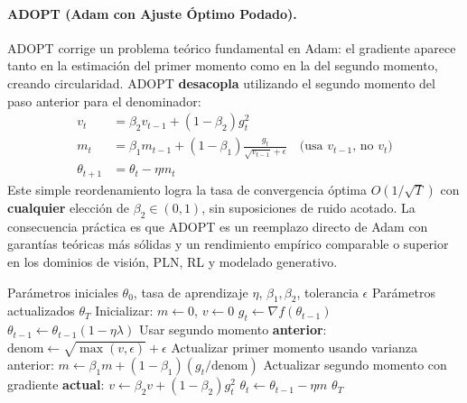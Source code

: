 \paragraph{ADOPT (Adam con Ajuste Óptimo Podado).}
ADOPT corrige un problema teórico fundamental en Adam: el gradiente aparece tanto en la estimación del primer momento como en la del segundo momento, creando circularidad. ADOPT \textbf{desacopla} utilizando el segundo momento del paso anterior para el denominador:
\begin{align}
v_t &= \beta_2 v_{t-1} + (1-\beta_2)g_t^2 \\
m_t &= \beta_1 m_{t-1} + (1-\beta_1)\frac{g_t}{\sqrt{v_{t-1}}+\epsilon} \quad\text{(usa $v_{t-1}$, no $v_t$)} \\
\theta_{t+1} &= \theta_t - \eta m_t
\end{align}
Este simple reordenamiento logra la tasa de convergencia óptima $O(1/\sqrt{T})$ con \textbf{cualquier} elección de $\beta_2 \in (0,1)$, sin suposiciones de ruido acotado. La consecuencia práctica es que ADOPT es un reemplazo directo de Adam con garantías teóricas más sólidas y un rendimiento empírico comparable o superior en los dominios de visión, PLN, RL y modelado generativo.

\begin{algorithm}[H]
\caption{ADOPT (Adam con Ajuste Óptimo Podado)}
\label{alg:adopt}
\begin{algorithmic}[1]
\Require Parámetros iniciales $\theta_0$, tasa de aprendizaje $\eta$, $\beta_1, \beta_2$, tolerancia $\epsilon$
\Ensure Parámetros actualizados $\theta_T$
\State Inicializar: $m \gets 0$, $v \gets 0$
    \State $g_t \gets \nabla f(\theta_{t-1})$
        \State $\theta_{t-1} \gets \theta_{t-1}(1 - \eta\lambda)$
    \EndIf
    \State Usar segundo momento \textbf{anterior}: $\text{denom} \gets \sqrt{\max(v, \epsilon)} + \epsilon$
    \State Actualizar primer momento usando varianza anterior: $m \gets \beta_1 m + (1-\beta_1)(g_t / \text{denom})$
    \State Actualizar segundo momento con gradiente \textbf{actual}: $v \gets \beta_2 v + (1-\beta_2) g_t^2$
    \State $\theta_t \gets \theta_{t-1} - \eta m$
\EndFor
\Return $\theta_T$
\end{algorithmic}
\end{algorithm}

